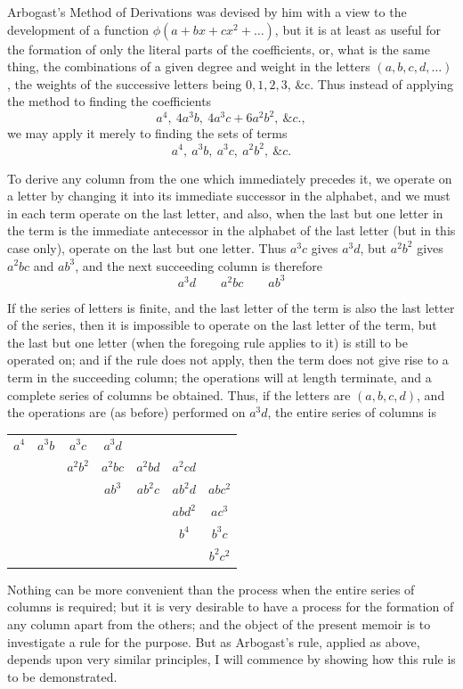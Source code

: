 \documentclass[11pt,a4paper]{book}
\begin{document}
Arbogast's Method of Derivations was devised by him with a view to the development of a function $\phi(a+bx+cx^2+\ldots)$, but it is at least as useful for the formation of only the literal parts of the coefficients, or, what is the same thing, the combinations of a given degree and weight in the letters $(a,b,c,d,\ldots)$, the weights of the successive letters being $0,1,2,3$, \&c. Thus instead of applying the method to finding the coefficients
\[
a^4,\ 4a^3b,\ 4a^3c+6a^2b^2,\ \&c.,
\]
we may apply it merely to finding the sets of terms
\[
a^4,\ a^3b,\ a^3c,\ a^2b^2,\ \&c.
\]

To derive any column from the one which immediately precedes it, we operate on a letter by changing it into its immediate successor in the alphabet, and we must in each term operate on the last letter, and also, when the last but one letter in the term is the immediate antecessor in the alphabet of the last letter (but in this case only), operate on the last but one letter. Thus $a^3c$ gives $a^3d$, but $a^2b^2$ gives $a^2bc$ and $ab^3$, and the next succeeding column is therefore
\[
a^3d\qquad a^2bc\qquad ab^3
\]

If the series of letters is finite, and the last letter of the term is also the last letter of the series, then it is impossible to operate on the last letter of the term, but the last but one letter (when the foregoing rule applies to it) is still to be operated on; and if the rule does not apply, then the term does not give rise to a term in the succeeding column; the operations will at length terminate, and a complete series of columns be obtained. Thus, if the letters are $(a,b,c,d)$, and the operations are (as before) performed on $a^3d$, the entire series of columns is
\begin{center}
\begin{tabular}{ccccccc}
$a^4$ & $a^3b$ & $a^3c$ & $a^3d$ & & & \\
 & & $a^2b^2$ & $a^2bc$ & $a^2bd$ & $a^2cd$ & \\
 & & & $ab^3$ & $ab^2c$ & $ab^2d$ & $abc^2$ \\
 & & & & & $abd^2$ & $ac^3$ \\
 & & & & & $b^4$ & $b^3c$ \\
 & & & & & & $b^2c^2$ \\
\end{tabular}
\end{center}

Nothing can be more convenient than the process when the entire series of columns is required; but it is very desirable to have a process for the formation of any column apart from the others; and the object of the present memoir is to investigate a rule for the purpose. But as Arbogast's rule, applied as above, depends upon very similar principles, I will commence by showing how this rule is to be demonstrated.
\end{document}
